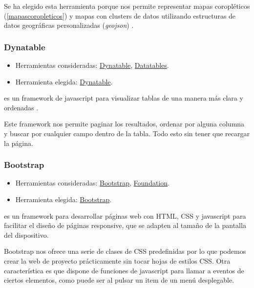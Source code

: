 Se ha elegido esta herramienta porque nos permite representar mapas coropléticos (\ref{mapascoropleticos}) y mapas con clusters de datos \cite{misc:foliumcluster} utilizando estructuras de datos geográficas personalizadas (\textit{geojson}) \cite{docs:geojson}.

\subsubsection{Dynatable}

\begin{itemize}
	\tightlist
	\item
	Herramientas consideradas:
	\href{https://www.dynatable.com/}{Dynatable}, 
	\href{https://datatables.net/}{Datatables}.
	\item
	Herramienta elegida:
	\href{https://www.dynatable.com/}{Dynatable}.
\end{itemize}

 es un framework de javascript para visualizar tablas de una manera más clara y ordenadas \cite{docs:dynatable}.

Este framework nos permite paginar los resultados, ordenar por alguna columna y buscar por cualquier campo dentro de la tabla. Todo esto sin tener que recargar la página.

\subsubsection{Bootstrap}

\begin{itemize}
	\tightlist
	\item
	Herramientas consideradas:
	\href{https://getbootstrap.com/}{Bootstrap}, 
	\href{https://foundation.zurb.com/}{Foundation}.
	\item
	Herramienta elegida:
	\href{https://getbootstrap.com/}{Bootstrap}.
\end{itemize}

 es un framework para desarrollar páginas web con HTML, CSS y javascript para facilitar el diseño de páginas responsive, que se adapten al tamaño de la pantalla del dispositivo.

Bootstrap nos ofrece una serie de clases de CSS predefinidas por lo que podemos crear la web de proyecto prácticamente sin tocar hojas de estilos CSS. Otra característica es que dispone de funciones de javascript para llamar a eventos de ciertos elementos, como puede ser al pulsar un item de un menú desplegable.

